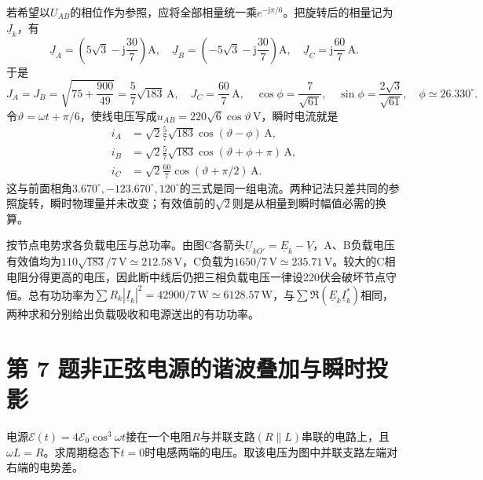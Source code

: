 \documentclass[UTF8,fontset=fandol,a4paper,11pt]{ctexart}
\begin{document}
若希望以$U_{AB}$的相位作为参照，应将全部相量统一乘$e^{-\mathrm j\pi/6}$。把旋转后的相量记为$\underline J_k$，有
\[
\underline J_A=\left(5\sqrt3-\mathrm j\frac{30}{7}\right)\mathrm A,\quad
\underline J_B=\left(-5\sqrt3-\mathrm j\frac{30}{7}\right)\mathrm A,\quad
\underline J_C=\mathrm j\frac{60}{7}\,\mathrm A.
\]
于是
\[
J_A=J_B=\sqrt{75+\frac{900}{49}}=\frac5{7}\sqrt{183}\,\mathrm A,
\quad J_C=\frac{60}{7}\,\mathrm A,
\quad \cos\phi=\frac7{\sqrt{61}},\quad
\sin\phi=\frac{2\sqrt3}{\sqrt{61}},\quad \phi\simeq26.330^\circ.
\]
令$\vartheta=\omega t+\pi/6$，使线电压写成$u_{AB}=220\sqrt6\cos\vartheta\,\mathrm V$，瞬时电流就是
\[
\begin{aligned}
i_A&=\sqrt2\frac5{7}\sqrt{183}\cos(\vartheta-\phi)\,\mathrm A,\\
i_B&=\sqrt2\frac5{7}\sqrt{183}\cos(\vartheta+\phi+\pi)\,\mathrm A,\\
i_C&=\sqrt2\frac{60}{7}\cos(\vartheta+\pi/2)\,\mathrm A.
\end{aligned}
\]
这与前面相角$3.670^\circ,-123.670^\circ,120^\circ$的三式是同一组电流。两种记法只差共同的参照旋转，瞬时物理量并未改变；有效值前的$\sqrt2$则是从相量到瞬时幅值必需的换算。

按节点电势求各负载电压与总功率。由图C各箭头$\underline U_{kO'}=\underline E_k-\underline V$，A、B负载电压有效值均为$110\sqrt{183}/7\,\mathrm V\simeq212.58\,\mathrm V$，C负载为$1650/7\,\mathrm V\simeq235.71\,\mathrm V$。较大的C相电阻分得更高的电压，因此断中线后仍把三相负载电压一律设220伏会破坏节点守恒。总有功功率为$\sum R_k|\underline I_k|^2=42900/7\,\mathrm W\simeq6128.57\,\mathrm W$，与$\sum\Re(\underline E_k\underline I_k^*)$相同，两种求和分别给出负载吸收和电源送出的有功功率。




\section*{第 7 题\quad 非正弦电源的谐波叠加与瞬时投影}\label{q:7}


电源$\mathcal E(t)=4\mathcal E_0\cos^3\omega t$接在一个电阻$R$与并联支路$(R\parallel L)$串联的电路上，且$\omega L=R$。求周期稳态下$t=0$时电感两端的电压。取该电压为图中并联支路左端对右端的电势差。
\end{document}
